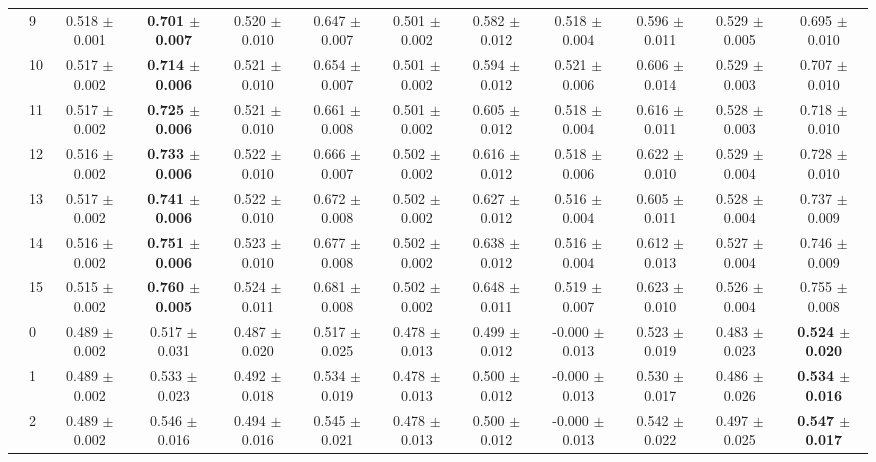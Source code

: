 \begin{table*}[t]
{\begin{tabular}{%
  ll
  @{\quad}
  c@{\hskip 4pt}c
  @{\quad\quad}
  c@{\hskip 4pt}c
  @{\quad\quad}
  c@{\hskip 4pt}c
  @{\quad\quad}
  c@{\hskip 4pt}c
  @{\quad\quad}
  c@{\hskip 4pt}c
}
        & 9 & 0.518 $\pm$ 0.001 & \textbf{0.701 $\pm$ 0.007} & 0.520 $\pm$ 0.010 & 0.647 $\pm$ 0.007 & 0.501 $\pm$ 0.002 & 0.582 $\pm$ 0.012 & 0.518 $\pm$ 0.004 & 0.596 $\pm$ 0.011 & 0.529 $\pm$ 0.005 & 0.695 $\pm$ 0.010 \\
        & 10 & 0.517 $\pm$ 0.002 & \textbf{0.714 $\pm$ 0.006} & 0.521 $\pm$ 0.010 & 0.654 $\pm$ 0.007 & 0.501 $\pm$ 0.002 & 0.594 $\pm$ 0.012 & 0.521 $\pm$ 0.006 & 0.606 $\pm$ 0.014 & 0.529 $\pm$ 0.003 & 0.707 $\pm$ 0.010 \\
        & 11 & 0.517 $\pm$ 0.002 & \textbf{0.725 $\pm$ 0.006} & 0.521 $\pm$ 0.010 & 0.661 $\pm$ 0.008 & 0.501 $\pm$ 0.002 & 0.605 $\pm$ 0.012 & 0.518 $\pm$ 0.004 & 0.616 $\pm$ 0.011 & 0.528 $\pm$ 0.003 & 0.718 $\pm$ 0.010 \\
        & 12 & 0.516 $\pm$ 0.002 & \textbf{0.733 $\pm$ 0.006} & 0.522 $\pm$ 0.010 & 0.666 $\pm$ 0.007 & 0.502 $\pm$ 0.002 & 0.616 $\pm$ 0.012 & 0.518 $\pm$ 0.006 & 0.622 $\pm$ 0.010 & 0.529 $\pm$ 0.004 & 0.728 $\pm$ 0.010 \\
        & 13 & 0.517 $\pm$ 0.002 & \textbf{0.741 $\pm$ 0.006} & 0.522 $\pm$ 0.010 & 0.672 $\pm$ 0.008 & 0.502 $\pm$ 0.002 & 0.627 $\pm$ 0.012 & 0.516 $\pm$ 0.004 & 0.605 $\pm$ 0.011 & 0.528 $\pm$ 0.004 & 0.737 $\pm$ 0.009 \\
        & 14 & 0.516 $\pm$ 0.002 & \textbf{0.751 $\pm$ 0.006} & 0.523 $\pm$ 0.010 & 0.677 $\pm$ 0.008 & 0.502 $\pm$ 0.002 & 0.638 $\pm$ 0.012 & 0.516 $\pm$ 0.004 & 0.612 $\pm$ 0.013 & 0.527 $\pm$ 0.004 & 0.746 $\pm$ 0.009 \\
        & 15 & 0.515 $\pm$ 0.002 & \textbf{0.760 $\pm$ 0.005} & 0.524 $\pm$ 0.011 & 0.681 $\pm$ 0.008 & 0.502 $\pm$ 0.002 & 0.648 $\pm$ 0.011 & 0.519 $\pm$ 0.007 & 0.623 $\pm$ 0.010 & 0.526 $\pm$ 0.004 & 0.755 $\pm$ 0.008 \\
\midrule
\assist{} & 0 & 0.489 $\pm$ 0.002 & 0.517 $\pm$ 0.031 & 0.487 $\pm$ 0.020 & 0.517 $\pm$ 0.025 & 0.478 $\pm$ 0.013 & 0.499 $\pm$ 0.012 & -0.000 $\pm$ 0.013 & 0.523 $\pm$ 0.019 & 0.483 $\pm$ 0.023 & \textbf{0.524 $\pm$ 0.020} \\
        & 1 & 0.489 $\pm$ 0.002 & 0.533 $\pm$ 0.023 & 0.492 $\pm$ 0.018 & 0.534 $\pm$ 0.019 & 0.478 $\pm$ 0.013 & 0.500 $\pm$ 0.012 & -0.000 $\pm$ 0.013 & 0.530 $\pm$ 0.017 & 0.486 $\pm$ 0.026 & \textbf{0.534 $\pm$ 0.016} \\
        & 2 & 0.489 $\pm$ 0.002 & 0.546 $\pm$ 0.016 & 0.494 $\pm$ 0.016 & 0.545 $\pm$ 0.021 & 0.478 $\pm$ 0.013 & 0.500 $\pm$ 0.012 & -0.000 $\pm$ 0.013 & 0.542 $\pm$ 0.022 & 0.497 $\pm$ 0.025 & \textbf{0.547 $\pm$ 0.017} \\

\end{tabular}}
\end{table*}
